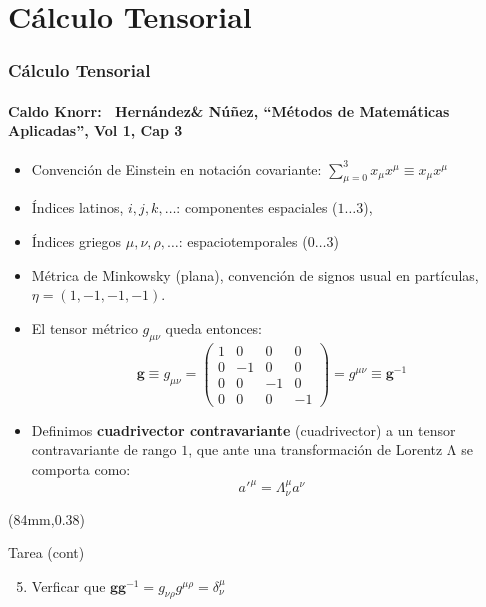 \documentclass[xetex,mathserif,serif,10pt]{beamer}
\begin{document}
\section{Cálculo Tensorial}
\begin{frame}
	\frametitle{Cálculo Tensorial}
  \framesubtitle{Caldo Knorr\textregistered:~ Hernández\& Núñez, ``Métodos de Matemáticas Aplicadas'', Vol 1, Cap 3}
  \begin{itemize}
    \item Convención de Einstein en notación covariante: $\sum_{\mu=0}^3 x_\mu x^\mu \equiv x_\mu x^\mu$
    \item Índices latinos, $i,j,k,\ldots$: componentes espaciales ($1\ldots 3$),
    \item Índices griegos $\mu, \nu, \rho, \ldots$: espaciotemporales ($0\ldots 3$)
    \item Métrica de Minkowsky (plana), convención de signos usual en partículas, $\eta=(1,-1,-1,-1)$.
    \item El tensor métrico $g_{\mu\nu}$ queda entonces:
      \begin{equation}\label{EQmetrica}
        \mathbf{g} \equiv g_{\mu\nu} = \left ( 
          \begin{array}{cccc}
            1 & 0 & 0 & 0 \\
            0 & -1 & 0 & 0 \\
            0 & 0 & -1 & 0 \\
            0 & 0 & 0 & -1
          \end{array}
          \right ) = g^{\mu\nu}\equiv \mathbf{g}^{-1}
      \end{equation}
    \item Definimos {\bf{cuadrivector contravariante}} (cuadrivector) a un \alert{tensor contravariante de rango $1$}, que ante una transformación de Lorentz Λ se comporta como:
      \begin{equation}
        a'^\mu = \Lambda^{\mu}_{\nu} a^\nu
      \end{equation}
  \end{itemize}
  \begin{textblock*}{41mm}(84mm,0.38\textheight)
    \tiny 
    {
      \begin{exampleblock}{\tiny{Tarea (cont)}}
        \begin{enumerate}\setcounter{enumi}{04}
          \item Verficar que $\mathbf{g}\mathbf{g}^{-1} = g_{\nu\rho} g^{\mu\rho} = \delta^\mu_\nu$

\end{enumerate}
\end{exampleblock}}
\end{textblock*}
\end{frame}
\end{document}
